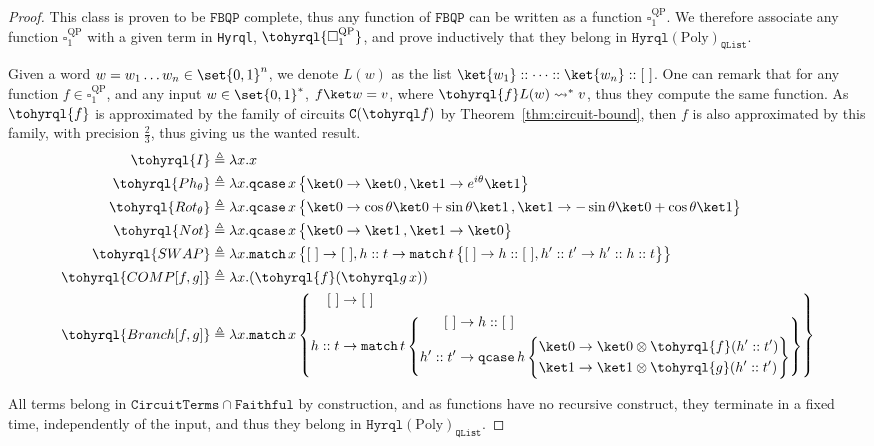 \documentclass[10pt,a4paper]{article}
\newcommand{\nil}{[~]}
\newcommand{\textqcase}{\ensuremath{\mathtt{qcase}}}
\newcommand{\textmatch}{\ensuremath{\mathtt{match}}}
\newcommand{\zket}{\ket 0}
\newcommand{\oket}{\ket 1}
\newcommand{\qcasebase}[2]{
  \textqcase\,#1\left\{\! \begin{aligned} #2 \end{aligned}\right\}
}
\newcommand{\qcase}[3]{
  \qcasebase {#1} {\zket \to #2\,, \oket \to #3}
}
\newcommand{\qcasesplit}[3]{
  \qcasebase {#1} { 
    \begin{aligned} 
      \zket &\to #2 \\ \oket &\to #3 
    \end{aligned}
  }
}
\newcommand{\match}[2]{
  \textmatch\,#1\left\{\! \begin{aligned} #2 \end{aligned}\right\}
}
\newcommand{\lbd}[2]{\lambda #1 .#2}
\newcommand{\reduces}{\rightsquigarrow}
\newcommand{\sreduces}{\reduces^*}
\newcommand{\fbqpscript}{\mathtt{QList}}
\newcommand{\circuittype}{\ensuremath{\mathtt{CircuitTerms}}}
\newcommand{\hyrqlbound}[1]{\ensuremath{\mathtt{Hyrql}({#1})}}
\newcommand{\hyrqlpoly}{\hyrqlbound{\mathrm{Poly}}_\fbqpscript}
\newcommand{\boundedrec}{\ensuremath{\mathtt{Faithful}}}
\newcommand{\hyrql}{{{\tt{Hyrql}}}}
\newcommand{\fbqp}{\ensuremath{\mathtt{FBQP}}}
\begin{document}
\begin{proof}
  This class is proven to be \fbqp{} complete, thus any function of \fbqp{} can
  be written as a function $\square_1^{\mathrm{QP}}$. We therefore associate
  any function $\square_1^{\mathrm{QP}}$ with a given term in \hyrql{},
  $\tohyrql{\square_1^{\mathrm{QP}}}$, and prove inductively that they belong
  in $\hyrqlpoly$.

  Given a word $w = w_1 \dots w_n\in \set{0,1}^n$, we denote $L(w)$ as the list
  $\ket{w_1}:: \dots :: \ket{w_n} :: \nil$. One can remark that for any
  function $f \in \square_1^{\mathrm{QP}}$, and any input $w \in \set{0,1}^*$,
  $f\ket w = v$, where $\tohyrql{f}L(w) \sreduces v$, thus they compute the
  same function. As $\tohyrql{f}$ is approximated by the family of circuits
  $\mathtt C(\tohyrql f)$ by Theorem~\ref{thm:circuit-bound}, then $f$ is also
  approximated by this family, with precision $\frac 2 3$, thus giving us the
  wanted result.
  \[
    \begin{aligned}
      \tohyrql{I} &\triangleq \lbd x x \\
      \tohyrql{Ph_\theta} &\triangleq \lbd x \qcase x \zket
      {e^{i \theta} \oket} \\
      \tohyrql{Rot_\theta} &\triangleq \lbd x \qcase x {\cos
      \theta \zket + \sin \theta \oket}{-\sin \theta \zket + \cos
      \theta \oket} \\
      \tohyrql{Not} &\triangleq \lbd x \qcase x \oket \zket \\
      \tohyrql{SWAP} &\triangleq \lbd x \match x {
        \nil \to \nil,
        h::t \to \match t {
          \nil \to h::\nil,
          h'::t' \to h'::h::t
        }
      } \\
      \tohyrql{COMP[f, g]} &\triangleq \lbd x
      (\tohyrql{f}(\tohyrql g\,x)) \\
      \tohyrql{Branch[f, g]} &\triangleq \lbd x \match x {
        \nil &\to \nil \\
        h::t &\to \match t {
          \nil &\to h::\nil \\
          h'::t' &\to \qcasesplit h {
            \zket \otimes \tohyrql{f}(h'::t')
          } {
            \oket \otimes \tohyrql{g}(h'::t')
          }
        }
      }
    \end{aligned}
  \]

  All terms belong in $\circuittype \cap \boundedrec$ by construction, and as
  functions have no recursive construct, they terminate in a fixed time,
  independently of the input, and thus they belong in $\hyrqlpoly$.


\end{proof}
\end{document}
